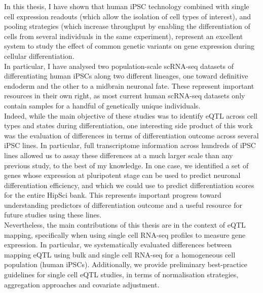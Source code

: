 
In this thesis, I have shown that human iPSC technology combined with single cell expression readouts (which allow the isolation of cell types of interest), and pooling strategies (which increase throughput by enabling the differentiation of cells from several individuals in the same experiment), represent an excellent system to study the effect of common genetic variants on gene expression during cellular differentiation. 
\\

In particular, I have analysed two population-scale scRNA-seq datasets of differentiating human iPSCs along two different lineages, one toward definitive endoderm and the other to a midbrain neuronal fate. 
These represent important resources in their own right, as most current human scRNA-seq datasets only contain samples for a handful of genetically unique individuals.
\\

Indeed, while the main objective of these studies was to identify eQTL across cell types and states during differentiation, one interesting side product of this work was the evaluation of differences in terms of differentiation outcome across several iPSC lines.
In particular, full transcriptome information across hundreds of iPSC lines allowed us to assay these differences at a much larger scale than any previous study, to the best of my knowledge.
In one case, we identified a set of genes whose expression at pluripotent stage can be used to predict neuronal differentiation efficiency, and which we could use to predict differentiation scores for the entire HipSci bank.
This represents important progress toward understanding predictors of differentiation outcome and a useful resource for future studies using these lines. \\

Nevertheless, the main contributions of this thesis are in the context of eQTL mapping, specifically when using single cell RNA-seq profiles to measure gene expression.
In particular, we systematically evaluated differences between mapping eQTL using bulk and single cell RNA-seq for a homogeneous cell population (human iPSCs).
Additionally, we provide preliminary best-practice guidelines for single cell eQTL studies, in terms of normalisation strategies, aggregation approaches and covariate adjustment.\\

